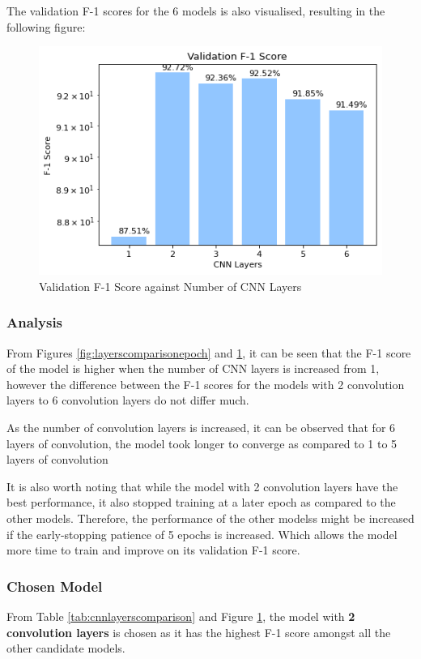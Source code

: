 \documentclass[sigconf,nonacm=true]{acmart}
\begin{document}
The validation F-1 scores for the 6 models is also visualised, resulting in the following figure: 
\begin{figure}[H]
	\centering
	\includegraphics[scale=0.57]{figures/bestf1.png}
	\caption{Validation F-1 Score against Number of CNN Layers}
	\label{fig:layerscomparison}
\end{figure}

\subsubsection{Analysis}
From Figures \ref{fig:layerscomparisonepoch} and \ref{fig:layerscomparison}, it can be seen that the F-1 score of the model is higher when the number of CNN layers is increased from 1, however the difference between the F-1 scores for the models with 2 convolution layers to 6 convolution layers do not differ much.

As the number of convolution layers is increased, it can be observed that for 6 layers of convolution, the model took longer to converge as compared to 1 to 5 layers of convolution

It is also worth noting that while the model with 2 convolution layers have the best performance, it also stopped training at a later epoch as compared to the other models. Therefore, the performance of the other modelss might be increased if the early-stopping patience of 5 epochs is increased. Which allows the model more time to train and improve on its validation F-1 score.

\subsubsection{Chosen Model}
\label{subsubsection:chosenCNN}
From Table \ref{tab:cnnlayerscomparison} and Figure \ref{fig:layerscomparison}, the model with \textbf{2 convolution layers} is chosen as it has the highest F-1 score amongst all the other candidate models.
\end{document}

